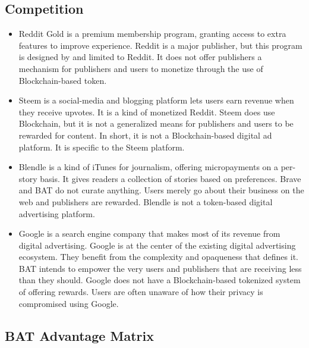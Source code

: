 \documentclass[11pt]{article}
\begin{document}
\subsection{Competition}
\label{sec-5-1}
\begin{itemize}
\item{Reddit Gold is a premium membership program, granting access to extra features to improve experience. Reddit is a major publisher, but this program is designed by and limited to Reddit. It does not offer publishers a mechanism for publishers and users to monetize through the use of Blockchain-based token.}
\item{Steem is a social-media and blogging platform lets users earn revenue when they receive upvotes. It is a kind of monetized Reddit. Steem does use Blockchain, but it is not a generalized means for publishers and users to be rewarded for content. In short, it is not a Blockchain-based digital ad platform. It is specific to the Steem platform. }
\item{Blendle is a kind of iTunes for journalism, offering micropayments on a per-story basis. It gives readers a collection of stories based on preferences. Brave and \textrm{BAT} do not curate anything. Users merely go about their business on the web and publishers are rewarded. Blendle is not a token-based digital advertising platform. }
\item{Google is a search engine company that makes most of its revenue from digital advertising. Google is at the center of the existing digital advertising ecosystem. They benefit from the complexity and opaqueness that defines it. \textrm{BAT} intends to empower the very users and publishers that are receiving less than they should. Google does not have a Blockchain-based tokenized system of offering rewards. Users are often unaware of how their privacy is compromised using Google.}
\end{itemize}

\subsection{\textrm{BAT} Advantage Matrix}
\label{sec-5-2}
\end{document}

